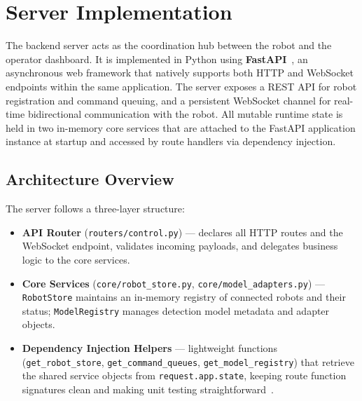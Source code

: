 
\section{Server Implementation}
\label{sec:server}

The backend server acts as the coordination hub between the robot and
the operator dashboard. It is implemented in Python using
\textbf{FastAPI}~\cite{fastapi2024}, an asynchronous web framework
that natively supports both HTTP and WebSocket endpoints within the
same application. The server exposes a REST API for robot registration
and command queuing, and a persistent WebSocket channel for real-time
bidirectional communication with the robot. All mutable runtime state
is held in two in-memory core services that are attached to the
FastAPI application instance at startup and accessed by route handlers
via dependency injection.

\subsection{Architecture Overview}
\label{sec:server_arch}

The server follows a three-layer structure:

\begin{itemize}
	\item \textbf{API Router} (\texttt{routers/control.py}) —
	declares all HTTP routes and the WebSocket endpoint,
	validates incoming payloads, and delegates business logic
	to the core services.
	
	\item \textbf{Core Services} (\texttt{core/robot\_store.py},
	\texttt{core/model\_adapters.py}) — \texttt{RobotStore}
	maintains an in-memory registry of connected robots and
	their status; \texttt{ModelRegistry} manages detection
	model metadata and adapter objects.
	
	\item \textbf{Dependency Injection Helpers} — lightweight
	functions (\texttt{get\_robot\_store},
	\texttt{get\_command\_queues},
	\texttt{get\_model\_registry}) that retrieve the shared
	service objects from \texttt{request.app.state}, keeping
	route function signatures clean and making unit testing
	straightforward~\cite{gamma1994design}.
\end{itemize}

